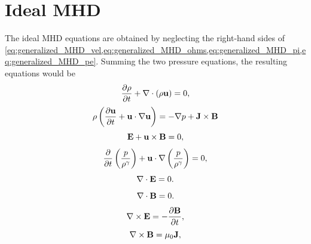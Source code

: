 \documentclass[a4paper,11pt]{report}
\begin{document}
\section{Ideal MHD}
The ideal MHD equations are obtained by neglecting the right-hand sides of \cref{eq:generalized_MHD_vel,eq:generalized_MHD_ohms,eq:generalized_MHD_pi,eq:generalized_MHD_pe}. Summing the two pressure equations, the resulting equations would be
\begin{equation}
    \frac{\partial \rho}{\partial t} + \nabla \cdot (\rho \mathbf{u}) = 0,
\end{equation}
\begin{equation}
    \rho \left (\frac{\partial \mathbf{u}}{\partial t} + \mathbf{u} \cdot \nabla \mathbf{u} \right ) = - \nabla p  + \mathbf{J} \times \mathbf{B}
\end{equation}
\begin{equation}
    \mathbf{E} + \mathbf{u} \times \mathbf{B} = 0,
\end{equation}
\begin{equation}
    \frac{\partial}{\partial t} \left ( \frac{p}{\rho^\gamma} \right ) + \mathbf{u} \cdot \nabla \left (\frac{p}{\rho^\gamma} \right ) = 0,
\end{equation}
\begin{equation}
    \nabla \cdot \mathbf{E} = 0.
\end{equation}
\begin{equation}
    \nabla \cdot \mathbf{B} = 0.
\end{equation}
\begin{equation}
    \nabla \times \mathbf{E} = -\frac{ \partial \mathbf{B}}{\partial t},
\end{equation}
\begin{equation}
    \nabla \times \mathbf{B} = \mu_0 \mathbf{J} ,
\end{equation}
\end{document}
